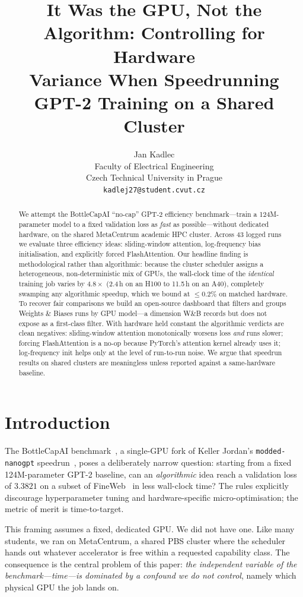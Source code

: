 \documentclass[11pt]{article}
\title{It Was the GPU, Not the Algorithm: Controlling for Hardware\\
Variance When Speedrunning GPT-2 Training on a Shared Cluster}
\author{Jan Kadlec \\
  Faculty of Electrical Engineering \\
  Czech Technical University in Prague \\
  \texttt{kadlej27@student.cvut.cz} \\}
\begin{document}
\maketitle

\begin{abstract}
We attempt the BottleCapAI ``no-cap'' GPT-2 efficiency benchmark---train a
124M-parameter model to a fixed validation loss as \emph{fast} as
possible---without dedicated hardware, on the shared MetaCentrum academic HPC
cluster. Across 43 logged runs we evaluate three efficiency ideas: sliding-window
attention, log-frequency bias initialisation, and explicitly forced
FlashAttention. Our headline finding is methodological rather than algorithmic:
because the cluster scheduler assigns a heterogeneous, non-deterministic mix of
GPUs, the wall-clock time of the \emph{identical} training job varies by
$4.8\times$ (2.4\,h on an H100 to 11.5\,h on an A40), completely swamping any
algorithmic speedup, which we bound at $\le\!0.2\%$ on matched hardware. To
recover fair comparisons we build an open-source dashboard that filters and
groups Weights \& Biases runs by GPU model---a dimension W\&B records but does
not expose as a first-class filter. With hardware held constant the algorithmic
verdicts are clean negatives: sliding-window attention monotonically worsens
loss \emph{and} runs slower; forcing FlashAttention is a no-op because PyTorch's
attention kernel already uses it; log-frequency init helps only at the level of
run-to-run noise. We argue that speedrun results on shared clusters are
meaningless unless reported against a same-hardware baseline.
\end{abstract}

\section{Introduction}

The BottleCapAI benchmark~\cite{bottlecap2025}, a single-GPU fork of Keller
Jordan's \texttt{modded-nanogpt} speedrun~\cite{jordan2024moddednanogpt}, poses a
deliberately narrow question: starting from a fixed 124M-parameter GPT-2
baseline, can an \emph{algorithmic} idea reach a validation loss of
$3.3821$ on a subset of FineWeb~\cite{penedo2024fineweb} in less wall-clock time?
The rules explicitly discourage hyperparameter tuning and hardware-specific
micro-optimisation; the metric of merit is time-to-target.

This framing assumes a fixed, dedicated GPU. We did not have one. Like many
students, we ran on MetaCentrum, a shared PBS cluster where the scheduler hands
out whatever accelerator is free within a requested capability class. The
consequence is the central problem of this paper: \emph{the independent variable
of the benchmark---time---is dominated by a confound we do not control}, namely
which physical GPU the job lands on.
\end{document}
